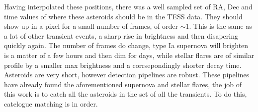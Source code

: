 \documentclass[12pt]{article}
\begin{document}
Having interpolated these positions, there was a well sampled set of RA, Dec and time values of where these asteroids should be in the TESS data.
They should show up in a pixel for a small number of frames, of order $\sim1$.
This is the same as a lot of other transient events, a sharp rise in brightness and then disapering quickly again.
The number of frames do change, type Ia supernova will brighten is a matter of a few hours and then dim for days, while stellar flares are of similar profile by a smaller max brightness and a corrsepondingly shorter decay time.
Asteroids are very short, however detection pipelines are robust.
These pipelines have already found the aforementioned supernova and stellar flares, the job of this work is to catch all the asteroids in the set of all the transients.
To do this, catelogue matching is in order.






\end{document}
